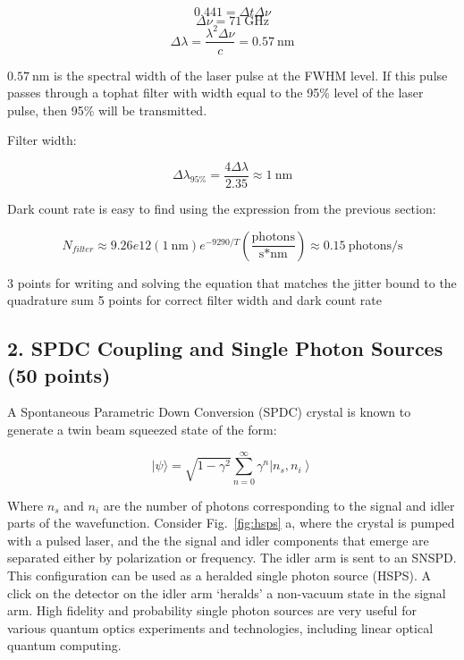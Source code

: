 \documentclass[11pt]{caltech_thesis} %
\begin{document}
\begin{enumerate}
{  }

  {\color{midnightblue} 

  \[ 0.441 = \Delta t \Delta \nu \] \[\Delta \nu = 71~\text{GHz}\]
  \[\Delta \lambda = \frac{\lambda^2 \Delta \nu}{c} = 0.57~\text{nm}\]

  }

  {\color{midnightblue}  \(0.57~\text{nm}\) is the spectral width of the
  laser pulse at the FWHM level. If this pulse passes through a tophat
  filter with width equal to the 95\% level of the laser pulse, then
  95\% will be transmitted. }

  {\color{midnightblue} Filter width: }

  {\color{midnightblue} 

  \[\Delta \lambda_{95\%} = \frac{4 \Delta \lambda}{2.35} \approx \boxed{1~\text{nm}} \]

  }

  {\color{midnightblue} Dark count rate is easy to find using the
  expression from the previous section: }

  {\color{midnightblue} 

  \[\boxed{N_{filter} \approx 9.26e12 (1~\text{nm}) e^{-9290/T} (\frac{\text{photons}}{\text{s*nm}})} \approx 0.15~\text{photons/s} \]

  }

  {\color{darkred} 3 points for writing and solving the equation that
  matches the jitter bound to the quadrature sum } {\color{darkred} 5
  points for correct filter width and dark count rate}
\end{enumerate}

\hypertarget{spdc-coupling-and-single-photon-sources-50-points}{%
\subsection{2. SPDC Coupling and Single Photon Sources (50
points)}\label{spdc-coupling-and-single-photon-sources-50-points}}

A Spontaneous Parametric Down Conversion (SPDC) crystal is known to
generate a twin beam squeezed state of the form:

\[|\psi\rangle= \sqrt{1 - \gamma^2} \sum_{n=0}^{\infty} \gamma^{n}\left|n_{s}, n_{i}\right\rangle \]

Where \(n_s\) and \(n_i\) are the number of photons corresponding to the
signal and idler parts of the wavefunction. Consider Fig.~\ref{fig:hsps}
a, where the crystal is pumped with a pulsed laser, and the the signal
and idler components that emerge are separated either by polarization or
frequency. The idler arm is sent to an SNSPD. This configuration can be
used as a heralded single photon source (HSPS). A click on the detector
on the idler arm `heralds' a non-vacuum state in the signal arm. High
fidelity and probability single photon sources are very useful for
various quantum optics experiments and technologies, including linear
optical quantum computing.
\end{document}
